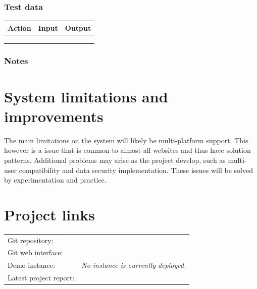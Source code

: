 \documentclass{article}
\begin{document}
\subsubsection*{Test data}
\begin{table}[h]
\centering
\begin{tabular}{lll}
\hline
\multicolumn{1}{|l|}{\textbf{Action}} & \multicolumn{1}{l|}{\textbf{Input}} & \multicolumn{1}{l|}{\textbf{Output}} \\ \hline
& & \\
& & \\
& &                      
\end{tabular}
\end{table}
\subsubsection*{Notes}
\hline

\newpage
\section{System limitations and improvements}
The main limitations on the system will likely be multi-platform support. This however is a issue that is common to almost all websites and thus have solution patterns. Additional problems may arise as the project develop, such as multi-user compatibility and data security implementation. These issues will be solved by experimentation and practice. 

\section{Project links}
\begin{table}[H]
\centering
\begin{tabular}{ll}
Git repository: & \href{git://github.com/willeponken/picoshop.git} \\
Git web interface: & \href{https://github.com/willeponken/picoshop} \\
Demo instance: & \textit{No instance is currently deployed.} \\
Latest project report: & \href{https://github.com/willeponken/picoshop-report/releases} \\
\end{tabular}
\end{table}
\end{document}
